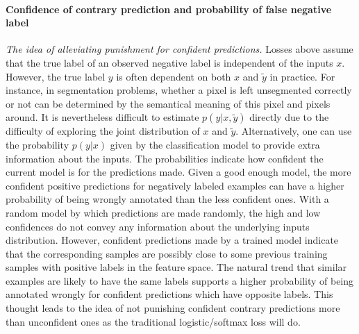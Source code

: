 \paragraph{Confidence of contrary prediction and probability of false negative label}
\noindent
\noindent \textit{The idea of alleviating punishment for confident predictions.}
Losses above assume that the true label of an observed negative label is independent of the inputs $x$.
However, the true label $y$ is often dependent on both $x$ and $\tilde{y}$ in practice.
For instance, in segmentation problems, whether a pixel is left unsegmented correctly or not can be determined by the semantical meaning of this pixel and pixels around.
It is nevertheless difficult to estimate $p(y \vert x, \tilde{y})$ directly due to the difficulty of exploring the joint distribution of $x$ and $\tilde{y}$.
Alternatively, one can use the probability $p(y \vert x)$ given by the classification model to provide extra information about the inputs.
The probabilities indicate how confident the current model is for the predictions made.
Given a good enough model, the more confident positive predictions for negatively labeled examples can have a higher probability of being wrongly annotated than the less confident ones.
With a random model by which predictions are made randomly, the high and low confidences do not convey any information about the underlying inputs distribution.
However, confident predictions made by a trained model indicate that the corresponding samples are possibly close to some previous training samples with positive labels in the feature space.
The natural trend that similar examples are likely to have the same labels supports a higher probability of being annotated wrongly for confident predictions which have opposite labels.
This thought leads to the idea of not punishing confident contrary predictions more than unconfident ones as the traditional logistic/softmax loss will do.

